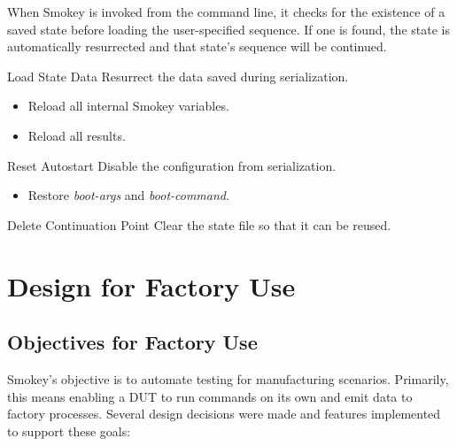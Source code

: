 \documentclass[11pt]{article}
\newcommand{\nvram}[1]{\mbox{\itshape#1}}
\begin{document}
When Smokey is invoked from the command line, it checks for the existence of a
saved state before loading the user-specified sequence.  If one is found, the
state is automatically resurrected and that state's sequence will be continued.

\begin{Definition}

\item[Load State Data] Resurrect the data saved during serialization.

	\begin{itemize}

	\item Reload all internal Smokey variables.

	\item Reload all results.

	\end{itemize}

\item[Reset Autostart] Disable the configuration from serialization.

	\begin{itemize}

	\item Restore \nvram{boot-args} and \nvram{boot-command}.

	\end{itemize}

\item[Delete Continuation Point] Clear the state file so that it can be
	reused.

\end{Definition}

\section{Design for Factory Use}

\subsection{Objectives for Factory Use}

Smokey's objective is to automate testing for manufacturing scenarios.
Primarily, this means enabling a DUT to run commands on its own and emit data
to factory processes.  Several design decisions were made and features
implemented to support these goals:
\end{document}
